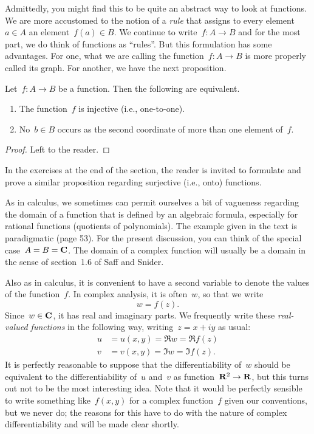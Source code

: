 \documentclass[twocolumn,12pt]{article}
\begin{document}
Admittedly, you might find this to be quite an abstract way to look at functions. We are more accustomed to the notion of a \emph{rule} that assigns to every element~$a \in A$ an element~$f(a) \in B$. We continue to write~$f \colon A \to B$ and for the most part, we do think of functions as ``rules''. But this formulation has some advantages. For one, what we are calling the function~$f \colon A \to B$ is more properly called its graph. For another, we have the next proposition.
\begin{proposition}
  Let~$f \colon A \to B$ be a function. Then the following are equivalent.
  \begin{enumerate}
    \item The function~$f$ is injective (i.e., one-to-one).
    \item No~$b \in B$ occurs as the second coordinate of more than one element of~$f$.
  \end{enumerate}
\end{proposition}
\begin{proof}
  Left to the reader.
\end{proof}
In the exercises at the end of the section, the reader is invited to formulate and prove a similar proposition regarding surjective (i.e., onto) functions.

As in calculus, we sometimes can permit ourselves a bit of vagueness regarding the domain of a function that is defined by an algebraic formula, especially for rational functions (quotients of polynomials). The example given in the text is paradigmatic (page 53). For the present discussion, you can think of the special case~$A = B = \mathbf{C}$. The domain of a complex function will usually be a domain in the sense of section~1.6 of Saff and Snider. 

Also as in calculus, it is convenient to have a second variable to denote the values of the function~$f$. In complex analysis, it is often~$w$, so that we write
\[
  w = f(z).
\]
Since~$w \in \mathbf{C}$, it has real and imaginary parts. We frequently write these \emph{real-valued functions} in the following way, writing~$z = x + iy$ as usual:
\begin{align*}
  u &= u(x, y) = \Re{w} = \Re{f(z)} \\
  v &= v(x, y) = \Im{w} = \Im{f(z)}.
\end{align*}
It is perfectly reasonable to suppose that the differentiability of~$w$ should be equivalent to the differentiability of~$u$ and~$v$ as function~$\mathbf{R}^2 \to \mathbf{R}$, but this turns out not to be the most interesting idea. Note that it would be perfectly sensible to write something like~$f(x, y)$ for a complex function~$f$ given our conventions, but we never do; the reasons for this have to do with the nature of complex differentiability and will be made clear shortly.
\end{document}
